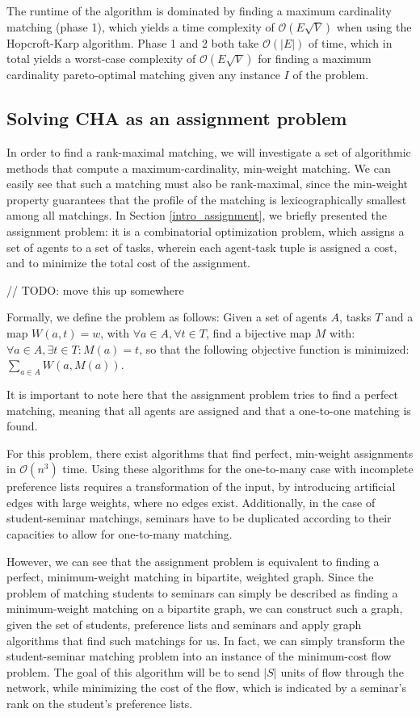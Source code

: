 The runtime of the algorithm is dominated by finding a maximum cardinality matching (phase 1), which yields a time complexity of $\mathcal{O}(E\sqrt{V})$\cite{Abraham:Pacha} when using the Hopcroft-Karp algorithm. Phase 1 and 2 both take $\mathcal{O}(|E|)$ of time\cite{SngThesis}, which in total yields a worst-case complexity of $\mathcal{O}(E\sqrt{V})$ for finding a maximum cardinality pareto-optimal matching given any instance $I$ of the problem.

\subsection{Solving CHA as an assignment problem}\label{algo:assignment}
In order to find a rank-maximal matching, we will investigate a set of algorithmic methods that compute a maximum-cardinality, min-weight matching. We can easily see that such a matching must also be rank-maximal, since the min-weight property guarantees that the profile of the matching is lexicographically smallest among all matchings.
In Section \ref{intro_assignment}, we briefly presented the assignment problem: it is a combinatorial optimization problem, which assigns a set of agents to a set of tasks, wherein each agent-task tuple is assigned a cost, and to minimize the total cost of the assignment. 

// TODO: move this up somewhere


Formally, we define the problem as follows: Given a set of agents $A$, tasks $T$ and a map $W(a, t) = w$, with $\forall a \in A, \forall t \in T$, find a bijective map $M$ with: $\forall a \in A, \exists t \in T: M(a) = t$, so that the following objective function is minimized: $\sum_{a \in A} W(a, M(a))$. 


It is important to note here that the assignment problem tries to find a perfect matching, meaning that all agents are assigned and that a one-to-one matching is found.

For this problem, there exist algorithms \cite{Munkres, Jonker1987} that find perfect, min-weight assignments in $\mathcal{O}(n^3)$ time. Using these algorithms for the one-to-many case with incomplete preference lists requires a transformation of the input, by introducing artificial edges with large weights, where no edges exist. Additionally, in the case of student-seminar matchings, seminars have to be duplicated according to their capacities to allow for one-to-many matching.
  
However, we can see that the assignment problem is equivalent to finding a perfect, minimum-weight matching in bipartite, weighted graph. Since the problem of matching students to seminars can simply be described as finding a minimum-weight matching on a bipartite graph, we can construct such a graph, given the set of students, preference lists and seminars and apply graph algorithms that find such matchings for us. In fact, we can simply transform the student-seminar matching problem into an instance of the minimum-cost flow problem. The goal of this algorithm will be to send $|S|$ units of flow through the network, while minimizing the cost of the flow, which is indicated by a seminar's rank on the student's preference lists.

